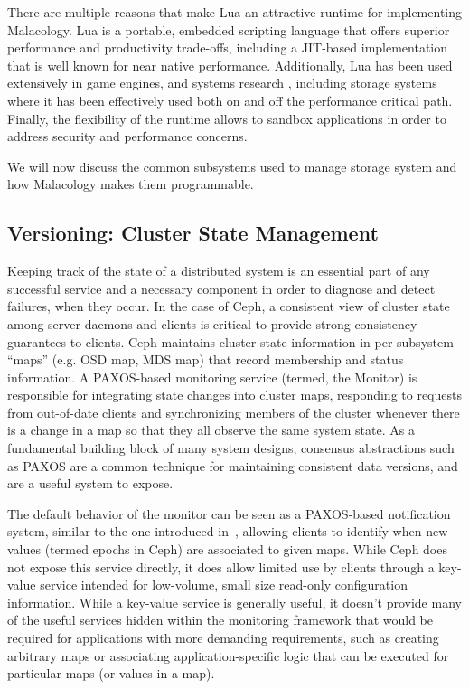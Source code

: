 \documentclass[preprint]{sigplanconf-eurosys}
\begin{document}
There are multiple reasons that make Lua an attractive runtime for implementing
Malacology. Lua is a portable, embedded scripting language that offers superior
performance and productivity trade-offs, including a JIT-based implementation
that is well known for near native performance. Additionally, Lua has been used
extensively in game engines, and systems research \cite{neto:dls14-luaos},
including storage systems where it has been effectively used both on
\cite{grawinkel:pdsw2012-lua,watkins2013:bdmc13-in-vivo,geambasu_comet_2010}
and off \cite{sevilla:sc15-mantle} the performance critical path. Finally, the
flexibility of the runtime allows to sandbox applications in order to address
security and performance concerns.

We will now discuss the common subsystems used to manage storage system and how
Malacology makes them programmable.

\subsection{Versioning: Cluster State Management}
\label{sec:mon}
\label{consistencyversioning-of-cluster-state}

Keeping track of the state of a distributed system is an essential part of any 
successful service and a necessary component in order to diagnose and detect 
failures, when they occur. In the case of Ceph, a consistent view of cluster 
state among server daemons and clients is critical to provide strong consistency 
guarantees to clients. Ceph maintains cluster state information in per-subsystem 
``maps'' (e.g. OSD map, MDS map) that record membership and status information. 
A PAXOS-based monitoring service (termed, the Monitor) is responsible for 
integrating state changes into cluster maps, responding to requests from 
out-of-date clients and synchronizing members of the cluster whenever there is a 
change in a map so that they all observe the same system state. As a fundamental 
building block of many system designs, consensus abstractions such as PAXOS are 
a common technique for maintaining consistent data versions, and are a useful 
system to expose.

The default behavior of the monitor can be seen as a PAXOS-based notification 
system, similar to the one introduced in~\cite{burrows_chubby_2006}, allowing 
clients to identify when new values (termed epochs in Ceph) are associated to 
given maps. While Ceph does not expose this service directly, it does allow 
limited use by clients through a key-value service intended for low-volume, 
small size read-only configuration information. While a key-value service is 
generally useful, it doesn't provide many of the useful services hidden within 
the monitoring framework that would be required for applications with more 
demanding requirements, such as creating arbitrary maps or associating 
application-specific logic that can be executed for particular maps (or values 
in a map).
\end{document}
